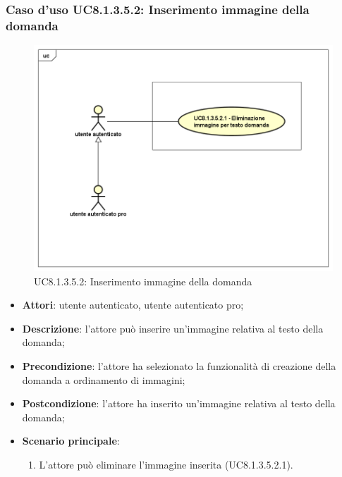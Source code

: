 \subsubsection{Caso d'uso UC8.1.3.5.2: Inserimento immagine della domanda}
\label{UC8.1.3.5.2}
\begin{figure}[h]
	\centering
	\includegraphics[scale=0.45,keepaspectratio]{UML/UC8_1_3_5_2.png}
	\caption{UC8.1.3.5.2: Inserimento immagine della domanda}
\end{figure}
\FloatBarrier
\begin{itemize}
	\item\textbf{Attori}: utente autenticato, utente autenticato pro;
	\item\textbf{Descrizione}: l'attore può inserire un'immagine relativa al testo della domanda;
	\item\textbf{Precondizione}: l'attore ha selezionato la funzionalità di creazione della domanda a ordinamento di immagini; 
	\item \textbf{Postcondizione}: l'attore ha inserito un'immagine relativa al testo della domanda;
	\item\textbf{Scenario principale}: 
		\begin{enumerate}
			\item L'attore può eliminare l'immagine inserita (UC8.1.3.5.2.1).
		\end{enumerate}
\end{itemize}

